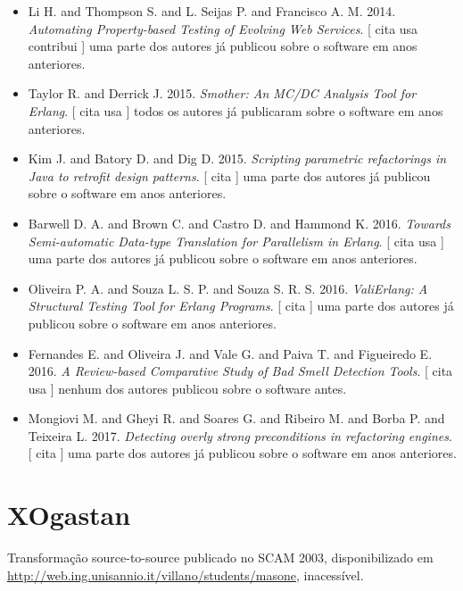 \begin{itemize}
      [
          cita
      ]
uma parte dos autores já publicou sobre o software em anos anteriores.
\item Li H. and Thompson S. and L. Seijas P. and Francisco A. M.
      2014.
        \textit{ Automating Property-based Testing of Evolving Web Services}.
      [
          cita
          usa
          contribui
      ]
uma parte dos autores já publicou sobre o software em anos anteriores.
\item Taylor R. and Derrick J.
      2015.
        \textit{ Smother: An MC/DC Analysis Tool for Erlang}.
      [
          cita
          usa
      ]
todos os autores já publicaram sobre o software em anos anteriores.
\item Kim J. and Batory D. and Dig D.
      2015.
        \textit{ Scripting parametric refactorings in Java to retrofit design patterns}.
      [
          cita
      ]
uma parte dos autores já publicou sobre o software em anos anteriores.
\item Barwell D. A. and Brown C. and Castro D. and Hammond K.
      2016.
        \textit{ Towards Semi-automatic Data-type Translation for Parallelism in Erlang}.
      [
          cita
          usa
      ]
uma parte dos autores já publicou sobre o software em anos anteriores.
\item Oliveira P. A. and Souza L. S. P. and Souza S. R. S.
      2016.
        \textit{ ValiErlang: A Structural Testing Tool for Erlang Programs}.
      [
          cita
      ]
uma parte dos autores já publicou sobre o software em anos anteriores.
\item Fernandes E. and Oliveira J. and Vale G. and Paiva T. and Figueiredo E.
      2016.
        \textit{ A Review-based Comparative Study of Bad Smell Detection Tools}.
      [
          cita
          usa
      ]
nenhum dos autores publicou sobre o software antes.
\item Mongiovi M. and Gheyi R. and Soares G. and Ribeiro M. and Borba P. and Teixeira L.
      2017.
        \textit{ Detecting overly strong preconditions in refactoring engines}.
      [
          cita
      ]
uma parte dos autores já publicou sobre o software em anos anteriores.
\end{itemize}
\section{XOgastan}

Transformação source-to-source
publicado no SCAM 2003,
disponibilizado em \url{http://web.ing.unisannio.it/villano/students/masone},
inacessível.

